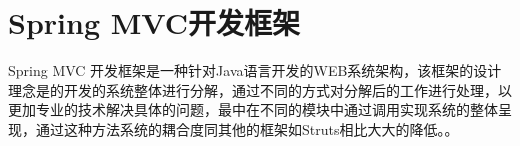 

\section{Spring MVC开发框架}

Spring MVC 开发框架是一种针对Java语言开发的WEB系统架构，该框架的设计理念是的开发的系统整体进行分解，通过不同的方式对分解后的工作进行处理，以更加专业的技术解决具体的问题，最中在不同的模块中通过调用实现系统的整体呈现，通过这种方法系统的耦合度同其他的框架如Struts相比大大的降低。\cite{林薇2015基于}。

